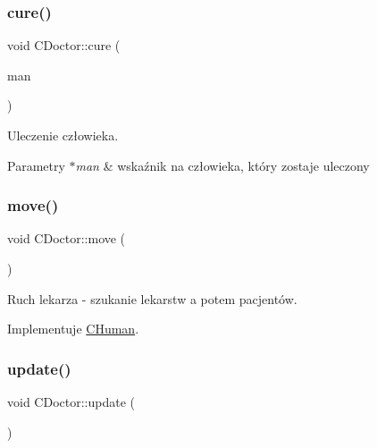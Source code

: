 \subsubsection{\texorpdfstring{cure()}{cure()}}
{\footnotesize\ttfamily void C\+Doctor\+::cure (\begin{DoxyParamCaption}\item[{\mbox{\hyperlink{class_c_human}{C\+Human}} $\ast$}]{man }\end{DoxyParamCaption})}



Uleczenie człowieka. 


\begin{DoxyParams}{Parametry}
{\em $\ast$man} & wskaźnik na człowieka, który zostaje uleczony \\
\hline
\end{DoxyParams}
\mbox{\label{class_c_doctor_a9fa8e8e952def12024b70231785d07be}} 
\subsubsection{\texorpdfstring{move()}{move()}}
{\footnotesize\ttfamily void C\+Doctor\+::move (\begin{DoxyParamCaption}{ }\end{DoxyParamCaption})\hspace{0.3cm}{\ttfamily [virtual]}}



Ruch lekarza -\/ szukanie lekarstw a potem pacjentów. 



Implementuje \mbox{\hyperlink{class_c_human_af0a61dfcb43e2d094ab66b29735c4424}{C\+Human}}.

\mbox{\label{class_c_doctor_a9ae22158d776a4c489158b9b944fbe80}} 
\subsubsection{\texorpdfstring{update()}{update()}}
{\footnotesize\ttfamily void C\+Doctor\+::update (\begin{DoxyParamCaption}{ }\end{DoxyParamCaption})\hspace{0.3cm}{\ttfamily [virtual]}}



